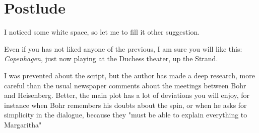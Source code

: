 \documentclass[a4paper,10pt]{article}
\begin{document}
\section*{Postlude}
I noticed some white space, so let me to fill it  other
suggestion.

Even if you has not liked anyone of the previous, I am
sure you will like this: {\it Copenhagen}, just now playing at
the Duchess theater, up the Strand. 

I was prevented about the script, but the author has made a deep research,
more careful than the usual newspaper comments about the meetings
between Bohr and Heisenberg. Better, the main plot has a lot of
deviations you will enjoy, for instance when Bohr remembers his doubts
about the spin, or when he asks for simplicity in the dialogue, because
they "must be able to explain everything to Margaritha"
\end{document}
